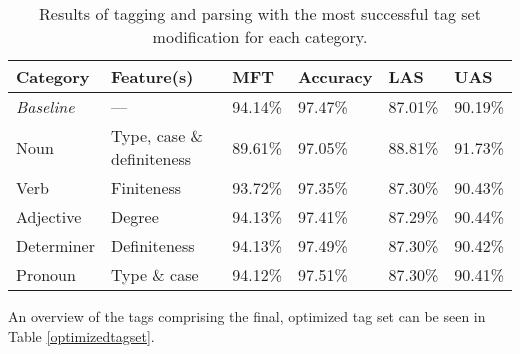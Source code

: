 \documentclass[11pt,a4paper]{article}
\begin{document}
\begin{table*}
    \centering
    \smaller[0.5]
    \begin{tabular}{@{}llllll@{}}
        \toprule
        \textbf{Category} & \textbf{Feature(s)} & \textbf{MFT} &
        \textbf{Accuracy} & \textbf{LAS} & \textbf{UAS} \\
        \midrule
        \emph{Baseline} & --- & 94.14\% & 97.47\% & 87.01\% & 90.19\% \\
        Noun & Type, case \& definiteness & 89.61\% & 97.05\% & 88.81\% &
        91.73\% \\
        Verb & Finiteness & 93.72\% & 97.35\% & 87.30\% & 90.43\% \\
        Adjective & Degree & 94.13\% & 97.41\% & 87.29\% & 90.44\% \\
        Determiner & Definiteness & 94.13\% & 97.49\% & 87.30\% & 90.42\% \\
        Pronoun & Type \& case & 94.12\% & 97.51\% & 87.30\% & 90.41\% \\
        \bottomrule
    \end{tabular}
    \caption{Results of tagging and parsing with the most successful tag set
        modification for each category.}
    \label{respectiveresults}
\end{table*}

An overview of the tags comprising the final, optimized tag set can be seen in
Table \ref{optimizedtagset}.
\end{document}
